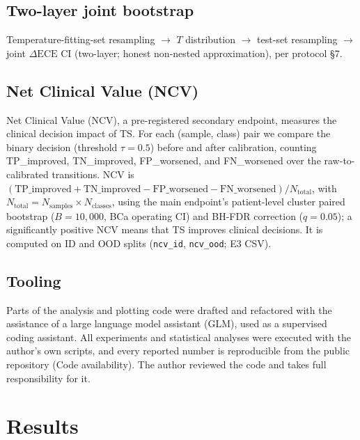 \documentclass[review,12pt,nonatbib]{elsarticle}
\begin{document}
\subsection{Two-layer joint bootstrap}
Temperature-fitting-set resampling $\rightarrow$ $T$ distribution
$\rightarrow$ test-set resampling $\rightarrow$ joint $\Delta\text{ECE}$ CI
(two-layer; honest non-nested approximation), per protocol \S7.

\subsection{Net Clinical Value (NCV)}
\label{sec:ncv_methods}
Net Clinical Value (NCV), a pre-registered secondary endpoint, measures
the clinical decision impact of TS. For each (sample, class)
pair we compare the binary decision (threshold $\tau=0.5$) before and
after calibration, counting TP\_improved, TN\_improved, FP\_worsened, and
FN\_worsened over the raw-to-calibrated transitions. NCV is
$(\text{TP\_improved} + \text{TN\_improved} - \text{FP\_worsened}
- \text{FN\_worsened}) / N_{\text{total}}$, with
$N_{\text{total}} = N_{\text{samples}} \times N_{\text{classes}}$, using
the main endpoint's patient-level cluster paired bootstrap ($B=10{,}000$,
BCa operating CI) and BH-FDR correction ($q=0.05$); a significantly
positive NCV means that TS improves clinical decisions. It is computed on
ID and OOD splits (\texttt{ncv\_id}, \texttt{ncv\_ood}; E3 CSV).

\subsection{Tooling}
\label{sec:tooling}
Parts of the analysis and plotting code were drafted and refactored with
the assistance of a large language model assistant (GLM), used as a
supervised coding assistant. All experiments and statistical
analyses were executed with the author's own scripts, and every reported
number is reproducible from the public repository (Code availability).
The author reviewed the code and takes full responsibility for it.

\section{Results}
\label{sec:results}

\end{document}
